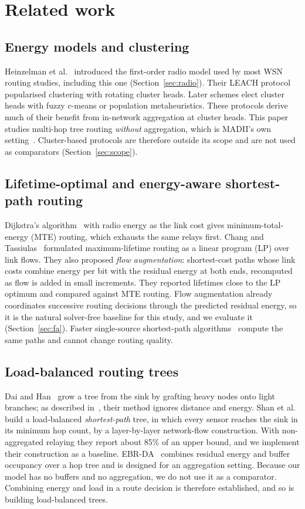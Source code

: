 \section{Related work}\label{sec:related}

\subsection{Energy models and clustering}
Heinzelman et al.~\cite{heinzelman2000leach} introduced the first-order radio model used by most WSN routing studies, including this one (Section~\ref{sec:radio}). Their LEACH protocol popularised clustering with rotating cluster heads. Later schemes elect cluster heads with fuzzy c-means or population metaheuristics. These protocols derive much of their benefit from in-network aggregation at cluster heads. This paper studies multi-hop tree routing \emph{without} aggregation, which is MADII's own setting~\cite{yang2025madii}. Cluster-based protocols are therefore outside its scope and are not used as comparators (Section~\ref{sec:scope}).

\subsection{Lifetime-optimal and energy-aware shortest-path routing}
Dijkstra's algorithm~\cite{dijkstra1959note} with radio energy as the link cost gives minimum-total-energy (MTE) routing, which exhausts the same relays first. Chang and Tassiulas~\cite{chang2004maximum} formulated maximum-lifetime routing as a linear program (LP) over link flows. They also proposed \emph{flow augmentation}: shortest-cost paths whose link costs combine energy per bit with the residual energy at both ends, recomputed as flow is added in small increments. They reported lifetimes close to the LP optimum and compared against MTE routing. Flow augmentation already coordinates successive routing decisions through the predicted residual energy, so it is the natural solver-free baseline for this study, and we evaluate it (Section~\ref{sec:fa}). Faster single-source shortest-path algorithms~\cite{duan2025sorting} compute the same paths and cannot change routing quality.

\subsection{Load-balanced routing trees}
Dai and Han~\cite{dai2003nodecentric} grow a tree from the sink by grafting heavy nodes onto light branches; as described in~\cite{shan2013lifetime}, their method ignores distance and energy. Shan et al.~\cite{shan2013lifetime} build a load-balanced \emph{shortest-path} tree, in which every sensor reaches the sink in its minimum hop count, by a layer-by-layer network-flow construction. With non-aggregated relaying they report about 85\% of an upper bound, and we implement their construction as a baseline. EBR-DA~\cite{mahdi2018ebrda} combines residual energy and buffer occupancy over a hop tree and is designed for an aggregation setting. Because our model has no buffers and no aggregation, we do not use it as a comparator. Combining energy and load in a route decision is therefore established, and so is building load-balanced trees.

